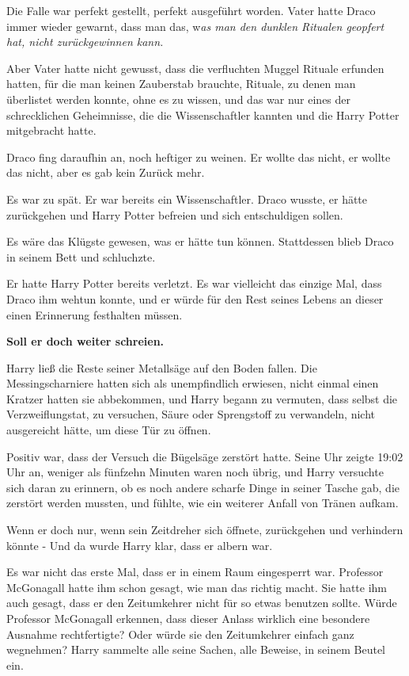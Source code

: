 {Die Falle war perfekt gestellt, perfekt ausgeführt worden. Vater hatte Draco immer wieder gewarnt, dass man das, w\emph{as man den dunklen Ritualen geopfert hat, nicht zurückgewinnen kann.}

Aber Vater hatte nicht gewusst, dass die verfluchten Muggel Rituale erfunden hatten, für die man keinen Zauberstab brauchte, Rituale, zu denen man überlistet werden konnte, ohne es zu wissen, und das war nur eines der schrecklichen Geheimnisse, die die Wissenschaftler kannten und die Harry Potter mitgebracht hatte.

Draco fing daraufhin an, noch heftiger zu weinen. Er wollte das nicht, er wollte das nicht, aber es gab kein Zurück mehr.

Es war zu spät. Er war bereits ein Wissenschaftler. Draco wusste, er hätte zurückgehen und Harry Potter befreien und sich entschuldigen sollen.

Es wäre das Klügste gewesen, was er hätte tun können. Stattdessen blieb Draco in seinem Bett und schluchzte.

Er hatte Harry Potter bereits verletzt. Es war vielleicht das einzige Mal, dass Draco ihm wehtun konnte, und er würde für den Rest seines Lebens an dieser einen Erinnerung festhalten müssen.

\textbf{Soll er doch weiter schreien.}

Harry ließ die Reste seiner Metallsäge auf den Boden fallen. Die Messingscharniere hatten sich als unempfindlich erwiesen, nicht einmal einen Kratzer hatten sie abbekommen, und Harry begann zu vermuten, dass selbst die Verzweiflungstat, zu versuchen, Säure oder Sprengstoff zu verwandeln, nicht ausgereicht hätte, um diese Tür zu öffnen.

Positiv war, dass der Versuch die Bügelsäge zerstört hatte. Seine Uhr zeigte 19:02 Uhr an, weniger als fünfzehn Minuten waren noch übrig, und Harry versuchte sich daran zu erinnern, ob es noch andere scharfe Dinge in seiner Tasche gab, die zerstört werden mussten, und fühlte, wie ein weiterer Anfall von Tränen aufkam.

Wenn er doch nur, wenn sein Zeitdreher sich öffnete, zurückgehen und verhindern könnte - Und da wurde Harry klar, dass er albern war.

Es war nicht das erste Mal, dass er in einem Raum eingesperrt war. Professor McGonagall hatte ihm schon gesagt, wie man das richtig macht. Sie hatte ihm auch gesagt, dass er den Zeitumkehrer nicht für so etwas benutzen sollte. Würde Professor McGonagall erkennen, dass dieser Anlass wirklich eine besondere Ausnahme rechtfertigte? Oder würde sie den Zeitumkehrer einfach ganz wegnehmen? Harry sammelte alle seine Sachen, alle Beweise, in seinem Beutel ein.

}
